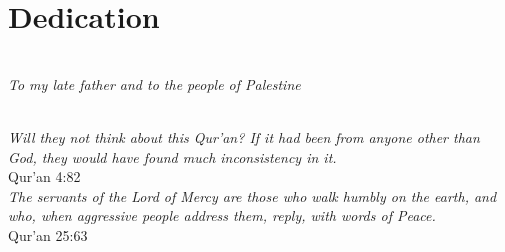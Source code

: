 \chapter*{Dedication}
\begin{center}
    \\

    \textit{To my late father and to the people of Palestine}
    \begin{minipage}{.6\linewidth}
        \centering
        \vspace{4cm}
        \\
        \textit{Will they not think about this Qur'an? If it had been from anyone other than God, they would have found much inconsistency in it.}\\
        {\sc Qur'an 4:82}\\[3cm]
        \textit{The servants of the Lord of Mercy are those who walk humbly on the earth, and who, when aggressive people address them, reply, with words of Peace.}\\
        {\sc Qur'an 25:63}\\[1cm]
    \end{minipage}
\end{center}